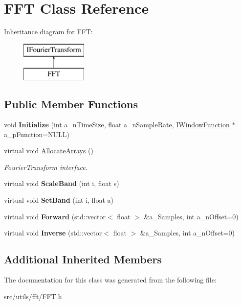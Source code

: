 \hypertarget{class_f_f_t}{}\section{F\+FT Class Reference}
\label{class_f_f_t}
Inheritance diagram for F\+FT\+:\begin{figure}[H]
\begin{center}
\leavevmode
\includegraphics[height=2.000000cm]{class_f_f_t}
\end{center}
\end{figure}
\subsection*{Public Member Functions}
\begin{DoxyCompactItemize}
\item 
\mbox{\label{class_f_f_t_a499bcf08055d90f0379fbb3b69932446}} 
void {\bfseries Initialize} (int a\+\_\+n\+Time\+Size, float a\+\_\+n\+Sample\+Rate, \hyperlink{class_i_window_function}{I\+Window\+Function} $\ast$a\+\_\+p\+Function=N\+U\+LL)
\item 
\mbox{\label{class_f_f_t_ae244f8b8ea4d8d043ec42a699db05cb9}} 
virtual void \hyperlink{class_f_f_t_ae244f8b8ea4d8d043ec42a699db05cb9}{Allocate\+Arrays} ()
\begin{DoxyCompactList}\small\item\em Fourier\+Transform interface. \end{DoxyCompactList}\item 
\mbox{\label{class_f_f_t_a367e2b06ea96c42fe012c477fd54132c}} 
virtual void {\bfseries Scale\+Band} (int i, float s)
\item 
\mbox{\label{class_f_f_t_a28af2a995d9d89baa54fbb9d6d0c8288}} 
virtual void {\bfseries Set\+Band} (int i, float a)
\item 
\mbox{\label{class_f_f_t_a3ee9e4cd928bfbf181e3b79c2527b57a}} 
virtual void {\bfseries Forward} (std\+::vector$<$ float $>$ \&a\+\_\+\+Samples, int a\+\_\+n\+Offset=0)
\item 
\mbox{\label{class_f_f_t_aa6d8c765a1cd6a2b5913fb3605206bdc}} 
virtual void {\bfseries Inverse} (std\+::vector$<$ float $>$ \&a\+\_\+\+Samples, int a\+\_\+n\+Offset=0)
\end{DoxyCompactItemize}
\subsection*{Additional Inherited Members}


The documentation for this class was generated from the following file\+:\begin{DoxyCompactItemize}
\item 
src/utils/fft/F\+F\+T.\+h\end{DoxyCompactItemize}
